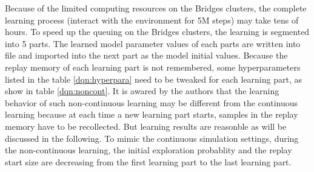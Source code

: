 \documentclass[12pt]{article}
\begin{document}
\begin{tcolorbox}
\begin{center}
\begin{enumerate}
Because of the limited computing resources on the Bridges clusters, the complete learning process (interact with the environment for 5M steps) may take tens of hours. To speed up the queuing on the Bridges clusters, the learning is segmented into 5 parts. The learned model parameter values of each parts are written into file and imported into the next part as the model initial values. Because the replay memory of each learning part is not remembered, some hyperparameters listed in the table \ref{dqn:hyperpara} need to be tweaked for each learning part, as show in table \ref{dqn:noncont}. It is awared by the authors that the learning behavior of such non-continuous learning may be different from the continuous learning because at each time a new learning part starts, samples in the replay memory have to be recollected. But learning results are reasonble as will be discussed in the following. To mimic the continuous simulation settings, during the non-continuous learning, the initial exploration probablity and the replay start size are decreasing from the first learning part to the last learning part. 


\end{enumerate}
\end{center}
\end{tcolorbox}
\end{document}
